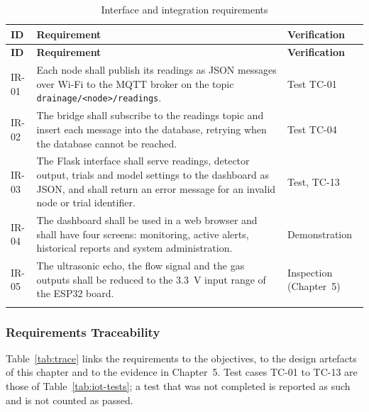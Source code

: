 \documentclass[12pt, a4paper]{article}
\begin{document}
\begin{longtable}{|p{1.4cm}|p{9.4cm}|p{2.5cm}|}
\hline
\textbf{ID} & \textbf{Requirement} & \textbf{Verification} \\
\hline
\endfirsthead
\hline
\textbf{ID} & \textbf{Requirement} & \textbf{Verification} \\
\hline
\endhead
IR-01 & Each node shall publish its readings as JSON messages over Wi-Fi to the MQTT broker on the topic \texttt{drainage/<node>/readings}. & Test TC-01 \\
\hline
IR-02 & The bridge shall subscribe to the readings topic and insert each message into the database, retrying when the database cannot be reached. & Test TC-04 \\
\hline
IR-03 & The Flask interface shall serve readings, detector output, trials and model settings to the dashboard as JSON, and shall return an error message for an invalid node or trial identifier. & Test, TC-13 \\
\hline
IR-04 & The dashboard shall be used in a web browser and shall have four screens: monitoring, active alerts, historical reports and system administration. & Demonstration \\
\hline
IR-05 & The ultrasonic echo, the flow signal and the gas outputs shall be reduced to the 3.3~V input range of the ESP32 board. & Inspection (Chapter~5) \\
\hline
\caption{Interface and integration requirements}\label{tab:ir}\\
\end{longtable}

\subsubsection{Requirements Traceability}

Table~\ref{tab:trace} links the requirements to the objectives, to the design artefacts of this chapter and to the evidence in Chapter~5. Test cases TC-01 to TC-13 are those of Table~\ref{tab:iot-tests}; a test that was not completed is reported as such and is not counted as passed.
\end{document}
